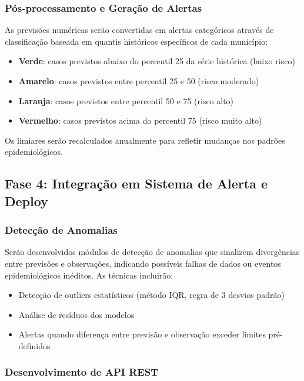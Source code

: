 \subsubsection{Pós-processamento e Geração de Alertas}

As previsões numéricas serão convertidas em alertas categóricos através de classificação baseada em quantis históricos específicos de cada município:
\begin{itemize}
    \item \textbf{Verde}: casos previstos abaixo do percentil 25 da série histórica (baixo risco)
    \item \textbf{Amarelo}: casos previstos entre percentil 25 e 50 (risco moderado)
    \item \textbf{Laranja}: casos previstos entre percentil 50 e 75 (risco alto)
    \item \textbf{Vermelho}: casos previstos acima do percentil 75 (risco muito alto)
\end{itemize}

Os limiares serão recalculados anualmente para refletir mudanças nos padrões epidemiológicos.

\subsection{Fase 4: Integração em Sistema de Alerta e Deploy}

\subsubsection{Detecção de Anomalias}

Serão desenvolvidos módulos de detecção de anomalias que sinalizem divergências entre previsões e observações, indicando possíveis falhas de dados ou eventos epidemiológicos inéditos. As técnicas incluirão:
\begin{itemize}
    \item Detecção de outliers estatísticos (método IQR, regra de 3 desvios padrão)
    \item Análise de resíduos dos modelos
    \item Alertas quando diferença entre previsão e observação exceder limites pré-definidos
\end{itemize}

\subsubsection{Desenvolvimento de API REST}

